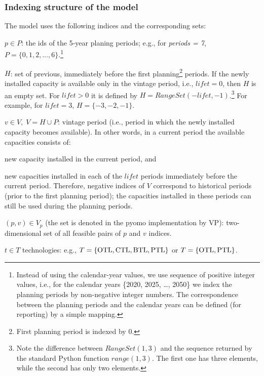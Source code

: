 \documentclass[a4paper,12pt]{article}
\begin{document}
\subsubsection{Indexing structure of the model}\label{sec:index}
The model uses the following indices and the corresponding sets:
\btlb
\item $p \in P$: the ids of the 5-year planing periods; e.g., for
	{\em periods = 7}, $P = \{0, 1, 2, \dots, 6\}$.\footnote{
	Instead of using the calendar-year values, we use sequence of positive integer
	values, i.e., for the calendar years \{2020, 2025, \dots, 2050\} we index
	the planning periods by non-negative integer numbers.
	The correspondence between the planning periods and the calendar years
	can be defined (for reporting) by a simple mapping.}
\item $H$: set of previous, immediately before the first planning\footnote{
	First planning period is indexed by 0.} periods.
	If the newly installed capacity is available only in the vintage period,
	i.e., $lifet = 0$, then $H$ is an empty set.
	For $lifet > 0$ it is defined by $H = RangeSet(-lifet, -1)$.\footnote{
	Note the difference between $RangeSet(1, 3)$ and the sequence returned by
	the standard Python function $range(1, 3)$. The first one has three elements,
	while the second has only two elements.}
	For example, for $lifet = 3$, $H = \{-3, -2, -1\}$.
\item $v \in V,\; V = H \cup P$: vintage period (i.e., period in which the newly
	installed capacity becomes available).
	In other words, in a current period the available capacities consists of:
	\btlbs
	\item new capacity installed in the current period, and
	\item new capacities installed in each of the $lifet$ periods immediately
		before the current period.
	\etls
	Therefore, negative indices of $V$ correspond to historical periods
	(prior to the first planning period); the capacities installed in these periods
	can still be used during the planning periods.
\item $(p, v) \in V_p$ (the set is denoted in the pyomo implementation by VP):
	two-dimensional set of all feasible pairs of $p$ and $v$ indices.
\item $t \in T$ technologies: e.g., $T = \{ {\rm OTL, CTL, BTL, PTL} \}$ or
	$T = \{ {\rm OTL, PTL} \}$.
\end{document}
